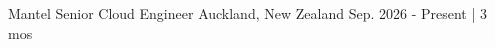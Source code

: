 


\begin{cventries}


\cventry
{Mantel} %
{Senior Cloud Engineer} %
{Auckland, New Zealand} %
{Sep. 2026 - Present | 3 mos} %
{ %
\begin{cvitems}
\end{cvitems}
}



\end{cventries}
